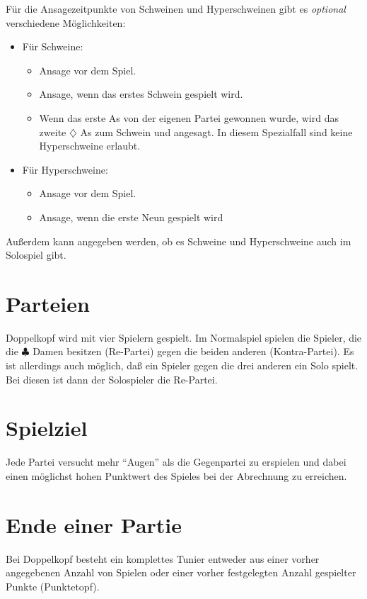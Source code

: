 \documentclass{scrartcl}
\newcommand{\kreuz}{$\clubsuit$\xspace}
\newcommand{\karo}{$\diamondsuit$\xspace}
\newcommand{\optional}{\textit{optional}\xspace}
\begin{document}
Für die Ansagezeitpunkte von Schweinen und Hyperschweinen gibt es \optional verschiedene Möglichkeiten:
\begin{itemize}
  \item Für Schweine:
    \begin{itemize}
      \item Ansage vor dem Spiel.
      \item Ansage, wenn das erstes Schwein gespielt wird.
      \item Wenn das erste As von der eigenen Partei gewonnen wurde, wird das
	zweite \karo As zum Schwein und angesagt.
	In diesem Spezialfall sind keine Hyperschweine erlaubt.
    \end{itemize}
  \item Für Hyperschweine:
    \begin{itemize}
      \item Ansage vor dem Spiel.
      \item Ansage, wenn die erste Neun gespielt wird
    \end{itemize}
\end{itemize}

Außerdem kann angegeben werden, ob es Schweine und Hyperschweine auch im Solospiel gibt.

\section{Parteien}
Doppelkopf wird mit vier Spielern gespielt. Im Normalspiel spielen die Spieler, die die \kreuz Damen besitzen (Re-Partei) gegen die beiden anderen (Kontra-Partei). Es ist allerdings auch möglich, daß ein Spieler gegen die drei anderen ein Solo spielt.  Bei diesen ist dann der Solospieler die Re-Partei.

\section{Spielziel}
Jede Partei versucht mehr "`Augen"' als die Gegenpartei zu erspielen und dabei einen möglichst hohen Punktwert des Spieles bei der Abrechnung zu erreichen.

\section{Ende einer Partie}
Bei Doppelkopf besteht ein komplettes Tunier entweder aus einer vorher angegebenen Anzahl von Spielen oder einer vorher festgelegten Anzahl gespielter Punkte (Punktetopf).
\end{document}

